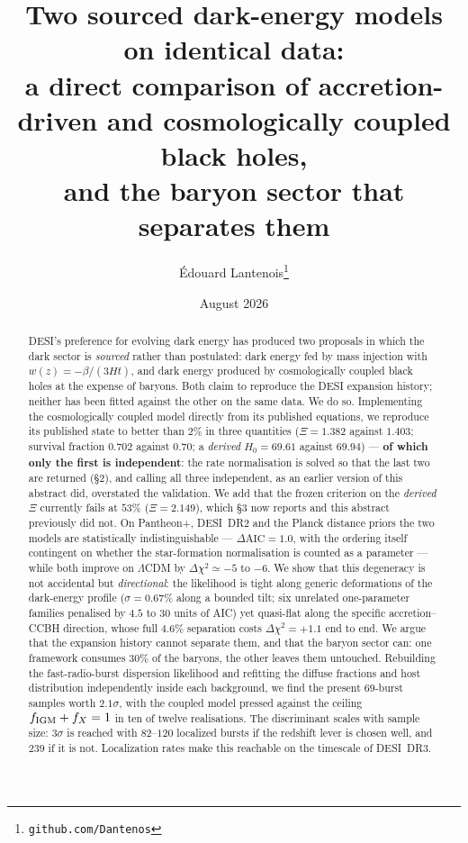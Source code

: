 \documentclass[11pt,a4paper]{article}
\title{\bf Two sourced dark-energy models on identical data:\\
a direct comparison of accretion-driven and cosmologically coupled black holes,\\
and the baryon sector that separates them}
\author{\'Edouard Lantenois\thanks{\texttt{github.com/Dantenos}}}
\date{August 2026}
\begin{document}
\maketitle

\begin{abstract}
\noindent
DESI's preference for evolving dark energy has produced two proposals in which the dark sector is
\emph{sourced} rather than postulated: dark energy fed by mass injection with
$w(z) = -\beta/(3Ht)$, and dark energy produced by cosmologically coupled black holes at the
expense of baryons. Both claim to reproduce the DESI expansion history; neither has been fitted
against the other on the same data. We do so. Implementing the cosmologically coupled model
directly from its published equations, we reproduce its published state to better than $2\%$ in
three quantities ($\Xi = 1.382$ against $1.403$; survival fraction $0.702$ against $0.70$; a \emph{derived} $H_0 = 69.61$ against $69.94$) --- \textbf{of which only the first is independent}: the rate normalisation is solved so that the last two are returned (\S2), and calling all three independent, as an earlier version of this abstract did, overstated the validation. We add that the frozen criterion on the \emph{derived} $\Xi$ currently fails at $53\%$ ($\Xi = 2.149$), which \S3 now reports and this abstract previously did not. On Pantheon+, DESI~DR2 and the Planck distance priors the two models are statistically
indistinguishable --- $\Delta\mathrm{AIC} = 1.0$, with the ordering itself contingent on whether the
star-formation normalisation is counted as a parameter --- while both improve on $\Lambda$CDM by
$\Delta\chi^2 \simeq -5$ to $-6$. We show that this degeneracy is not accidental but \emph{directional}: the likelihood is
tight along generic deformations of the dark-energy profile ($\sigma = 0.67\%$ along a bounded
tilt; six unrelated one-parameter families penalised by $4.5$ to $30$ units of AIC) yet
quasi-flat along the specific accretion--CCBH direction, whose full $4.6\%$ separation costs
$\Delta\chi^2 = +1.1$ end to end. We argue that the expansion history cannot separate them, and
that the baryon sector can: one framework consumes $30\%$ of the baryons, the other leaves them
untouched. Rebuilding the fast-radio-burst dispersion likelihood and refitting the diffuse
fractions and host distribution independently inside each background, we find the present
$69$-burst samples worth $2.1\sigma$, with the coupled model pressed against the ceiling
$f_{\rm IGM}+f_X = 1$ in ten of twelve realisations. The discriminant scales with sample size:
$3\sigma$ is reached with $82$--$120$ localized bursts if the redshift lever is chosen well, and $239$ if it is not. Localization rates make this
reachable on the timescale of DESI~DR3.
\end{abstract}
\end{document}
